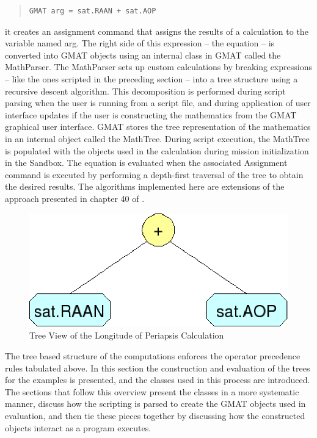\begin{quote}\begin{verbatim}
GMAT arg = sat.RAAN + sat.AOP
\end{verbatim}\end{quote}

\noindent it creates an assignment command that assigns the results of a calculation to the variable
named arg. The right side of this expression -- the equation -- is converted into GMAT objects using
an internal class in GMAT called the MathParser.  The MathParser sets up custom calculations by
breaking expressions -- like the ones scripted in the preceding section -- into a tree structure
using a recursive descent algorithm.  This decomposition is performed during script parsing when the
user is running from a script file, and during application of user interface updates if the user is
constructing the mathematics from the GMAT graphical user interface.  GMAT stores the tree
representation of the mathematics in an internal object called the MathTree.  During script
execution, the MathTree is populated with the objects used in the calculation during mission
initialization in the Sandbox.  The equation is evaluated when the associated Assignment command is
executed by performing a depth-first traversal of the tree to obtain the desired results.  The
algorithms implemented here are extensions of the approach presented in chapter 40 of
\cite{schildt}.

\begin{figure}[tb]
\begin{center}
\includegraphics[scale=0.5]{Images/nodePlusAop.eps}
\caption{\label{figure:longPeriapseTree}Tree View of the Longitude of Periapsis Calculation}
\end{center}
\end{figure}

The tree based structure of the computations enforces the operator precedence rules tabulated above.
 In this section the construction and evaluation of the trees for the examples is presented, and the
classes used in this process are introduced.  The sections that follow this overview present the
classes in a more systematic manner, discuss how the scripting is parsed to create the GMAT objects
used in evaluation, and then tie these pieces together by discussing how the constructed objects
interact as a program executes.

